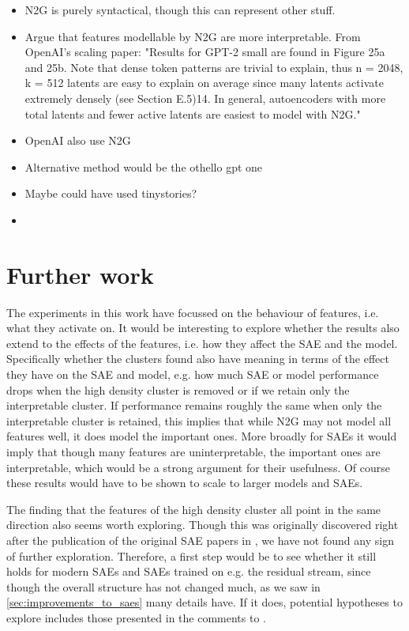 \begin{itemize}
    \item N2G is purely syntactical, though this can represent other stuff.
    \item Argue that features modellable by N2G are more interpretable. From OpenAI's scaling paper: "Results for GPT-2 small are found in Figure 25a and 25b. Note that dense token patterns are trivial to
    explain, thus n = 2048, k = 512 latents are easy to explain on average since many latents activate
    extremely densely (see Section E.5)14. In general, autoencoders with more total latents and fewer
    active latents are easiest to model with N2G."
    \item OpenAI also use N2G
    \item Alternative method would be the othello gpt one
    \item Maybe could have used tinystories?
    \item 
\end{itemize}

\section{Further work}
The experiments in this work have focussed on the behaviour of features, i.e. what they activate on.
It would be interesting to explore whether the results also extend to the effects of the features, i.e. how they affect the SAE and the model.
Specifically whether the clusters found also have meaning in terms of the effect they have on the SAE and model, e.g. how much SAE or model performance drops when the high density cluster is removed or if we retain only the interpretable cluster.
If performance remains roughly the same when only the interpretable cluster is retained, this implies that while N2G may not model all features well, it does model the important ones.
More broadly for SAEs it would imply that though many features are uninterpretable, the important ones are interpretable, which would be a strong argument for their usefulness.
Of course these results would have to be shown to scale to larger models and SAEs.

The finding that the features of the high density cluster all point in the same direction also seems worth exploring.
Though this was originally discovered right after the publication of the original SAE papers in \textcite{nanda_open_2023}, we have not found any sign of further exploration.
Therefore, a first step would be to see whether it still holds for modern SAEs and SAEs trained on e.g. the residual stream, since though the overall structure has not changed much, as we saw in \autoref{sec:improvements_to_saes} many details have.
If it does, potential hypotheses to explore includes those presented in the comments to \textcite{nanda_open_2023}.

